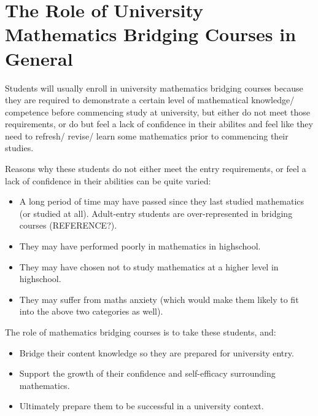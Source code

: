\documentclass[twoside,12pt,a4paper]{report}
\begin{document}
\section{The Role of University Mathematics Bridging Courses in General}

Students will usually enroll in university mathematics bridging courses because they are required to demonstrate a certain level of mathematical knowledge/ competence before commencing study at university, but either do not meet those requirements, or do but feel a lack of confidence in their abilites and feel like they need to refresh/ revise/ learn some mathematics prior to commencing their studies.

Reasons why these students do not either meet the entry requirements, or feel a lack of confidence in their abilities can be quite varied:
\begin{itemize}
	\item A long period of time may have passed since they last studied mathematics (or studied at all). Adult-entry students are over-represented in bridging courses (REFERENCE?).
	\item They may have performed poorly in mathematics in highschool.
	\item They may have chosen not to study mathematics at a higher level in highschool.
	\item They may suffer from maths anxiety (which would make them likely to fit into the above two categories as well).
\end{itemize}
	
The role of mathematics bridging courses is to take these students, and:
\begin{itemize}
	\item Bridge their content knowledge so they are prepared for university entry.
	\item Support the growth of their confidence and self-efficacy surrounding mathematics.
	\item Ultimately prepare them to be successful in a university context.
\end{itemize}
\end{document}
